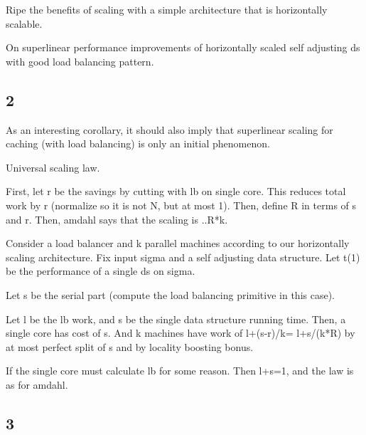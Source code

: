 Ripe the benefits of scaling with a simple architecture that is horizontally scalable.



On superlinear performance improvements of horizontally scaled self adjusting ds with good load balancing pattern.


\subsection{2}





As an interesting corollary, it should also imply that superlinear scaling for caching (with load balancing) is only an initial phenomenon.







Universal scaling law.

First, let r be the savings by cutting with lb on single core. This reduces total work by r (normalize so it is not N, but at most 1). Then, define R in terms of s and r. Then, amdahl says that the scaling is ..R*k.


Consider a load balancer and k parallel machines according to our horizontally scaling architecture. Fix input sigma and a self adjusting data structure. Let t(1) be the performance of a single ds on sigma.




Let s be the serial part (compute the load balancing primitive in this case).




Let l be the lb work, and s be the single data structure running time. Then, a single core has cost of s. And k machines have work of l+(s-r)/k= l+s/(k*R) by at most perfect split of s and by locality boosting bonus.

If the single core must calculate lb for some reason. Then l+s=1, and the law is as for amdahl.


\subsection{3}



